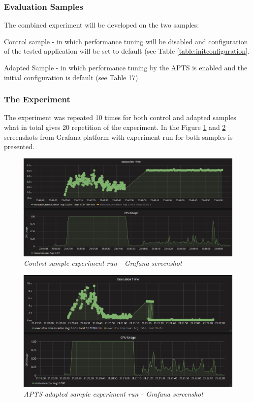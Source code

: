 \documentclass[10pt,a4paper]{article}
\let\tempone\itemize
\let\temptwo\enditemize
\renewenvironment{itemize}{\tempone\addtolength{\itemsep}{-0.4\baselineskip}}{\temptwo}
\begin{document}
\subsubsection{Evaluation Samples} 

The combined experiment will be developed on the two samples:
\begin{itemize}
\item Control sample - in which performance tuning will be disabled and configuration of the tested application will be set to default (see Table \ref{table:initconfiguration}. 
\item Adapted Sample - in which performance tuning by the APTS is enabled and the initial
configuration is default (see Table 17). 
\end{itemize}

\subsubsection{The Experiment} 

The experiment was repeated 10 times for both control and adapted samples what in total gives 20 repetition of the experiment. In the Figure \ref{figure:combined:screen:control} and \ref{figure:combined:screen:adapted} screenshots from Grafana platform with experiment run for both samples is presented.

\begin{figure}[!htb]
\centering
\includegraphics[width=1\textwidth]{combinedCtrl}
\caption{\textit{Control sample experiment run - Grafana screenshot}} \label{figure:combined:screen:control}
\end{figure}
\begin{figure}[!htb]
\centering
\includegraphics[width=1\textwidth]{combinedEval}
\caption{\textit{APTS adapted sample experiment run - Grafana screenshot}} \label{figure:combined:screen:adapted}
\end{figure}
\end{document}
